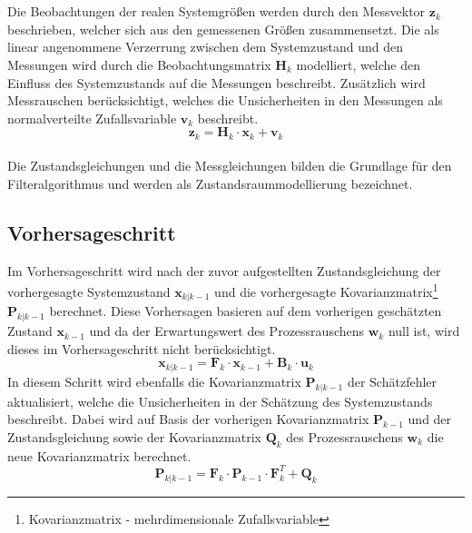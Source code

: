 \\
\\
Die Beobachtungen der realen Systemgrößen werden durch den Messvektor $\mathbf{z}_k$ beschrieben, welcher sich aus den gemessenen Größen zusammensetzt. Die als linear angenommene Verzerrung zwischen dem Systemzustand und den Messungen wird durch die Beobachtungsmatrix $\mathbf{H}_k$ modelliert, welche den Einfluss des Systemzustands auf die Messungen beschreibt. Zusätzlich wird Messrauschen berücksichtigt, welches die Unsicherheiten in den Messungen als normalverteilte Zufallsvariable $\mathbf{v}_k$ beschreibt.
\begin{equation}
    \mathbf{z}_k = \mathbf{H}_k \cdot \mathbf{x}_k + \mathbf{v}_k
\end{equation}
\\
Die Zustandsgleichungen und die Messgleichungen bilden die Grundlage für den Filteralgorithmus und werden als Zustandsraummodellierung bezeichnet.
\\

\subsection{Vorhersageschritt}
\label{subsec:vorhersageschritt}
Im Vorhersageschritt wird nach der zuvor aufgestellten Zustandsgleichung der vorhergesagte Systemzustand $\mathbf{x}_{k|k-1}$ und die vorhergesagte Kovarianzmatrix\footnote{Kovarianzmatrix - mehrdimensionale Zufallsvariable} $\mathbf{P}_{k|k-1}$ berechnet. Diese Vorhersagen basieren auf dem vorherigen geschätzten Zustand $\mathbf{x}_{k-1}$ und da der Erwartungswert des Prozessrauschens $\mathbf{w}_k$ null ist, wird dieses im Vorhersageschritt nicht berücksichtigt.
\begin{equation}
    \mathbf{x}_{k|k-1} = \mathbf{F}_k \cdot \mathbf{x}_{k-1} + \mathbf{B}_k \cdot \mathbf{u}_k
\end{equation}
In diesem Schritt wird ebenfalls die Kovarianzmatrix $\mathbf{P}_{k|k-1}$ der Schätzfehler aktualisiert, welche die Unsicherheiten in der Schätzung des Systemzustands beschreibt. Dabei wird auf Basis der vorherigen Kovarianzmatrix $\mathbf{P}_{k-1}$ und der Zustandsgleichung sowie der Kovarianzmatrix $\mathbf{Q}_k$ des Prozessrauschens $\mathbf{w}_k$ die neue Kovarianzmatrix berechnet.
\begin{equation}
    \mathbf{P}_{k|k-1} = \mathbf{F}_k \cdot \mathbf{P}_{k-1} \cdot \mathbf{F}_k^T + \mathbf{Q}_k
\end{equation}

